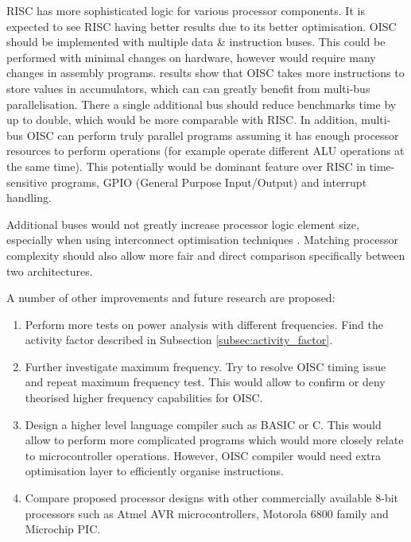 RISC has more sophisticated logic for various processor components. It is expected to see RISC having better results due to its better optimisation. OISC should be implemented with multiple data \& instruction buses. This could be performed with minimal changes on hardware, however would require many changes in assembly programs.  results show that OISC takes more instructions to store values in accumulators, which can can greatly benefit from multi-bus parallelisation. There a single additional bus should reduce benchmarks time by up to double, which would be more comparable with RISC. In addition, multi-bus OISC can perform truly parallel programs assuming it has enough processor resources to perform operations (for example operate different ALU operations at the same time). This potentially would be dominant feature over RISC in time-sensitive programs, GPIO (General Purpose Input/Output) and interrupt handling. 

Additional buses would not greatly increase processor logic element size, especially when using interconnect optimisation techniques \autocite{1207041,6972455}. Matching processor complexity should also allow more fair and direct comparison specifically between two architectures. 

A number of other improvements and future research are proposed:
\begin{enumerate}
	\item Perform more tests on power analysis with different frequencies. Find the activity factor described in Subsection \ref{subsec:activity_factor}.
	\item Further investigate maximum frequency. Try to resolve OISC timing issue and repeat maximum frequency test. This would allow to confirm or deny theorised higher frequency capabilities for OISC. 
	\item Design a higher level language compiler such as BASIC or C. This would allow to perform more complicated programs which would more closely relate to microcontroller operations. However, OISC compiler would need extra optimisation layer to efficiently organise instructions.
	\item Compare proposed processor designs with other commercially available 8-bit processors such as Atmel AVR microcontrollers, Motorola 6800 family and Microchip PIC.
\end{enumerate}

